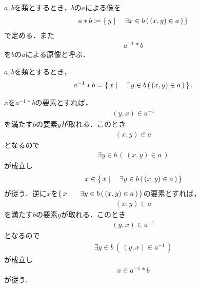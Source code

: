 	\begin{screen}
		\begin{dfn}[像・原像]
			$a,b$を類とするとき，$b$の$a$による像を
			\begin{align}
				a \ast b \coloneqq \left\{\, y \mid \quad \exists x \in b\, (\, (x,y) \in a\, )\, \right\} 
			\end{align}
			で定める．また
			\begin{align}
				a^{-1} \ast b
			\end{align}
			を$b$の$a$による原像と呼ぶ．
		\end{dfn}
	\end{screen}
	
	\begin{screen}
		\begin{thm}[原像はそこに写される定義域の要素の全体]
			$a,b$を類とするとき，
			\begin{align}
				a^{-1} \ast b = \left\{\, x \mid \quad \exists y \in b\, (\, (x,y) \in a\, )\, \right\}.
			\end{align}
		\end{thm}
	\end{screen}
	
	\begin{sketch}
		$x$を$a^{-1} \ast b$の要素とすれば，
		\begin{align}
			(y,x) \in a^{-1}
		\end{align}
		を満たす$b$の要素$y$が取れる．このとき
		\begin{align}
			(x,y) \in a
		\end{align}
		となるので
		\begin{align}
			\exists y \in b\, (\, (x,y) \in a\, )
		\end{align}
		が成立し
		\begin{align}
			x \in \left\{\, x \mid \quad \exists y \in b\, (\, (x,y) \in a\, )\, \right\}
		\end{align}
		が従う．逆に$x$を$\left\{\, x \mid \quad \exists y \in b\, (\, (x,y) \in a\, )\, \right\}$の要素とすれば，
		\begin{align}
			(x,y) \in a
		\end{align}
		を満たす$b$の要素$y$が取れる．このとき
		\begin{align}
			(y,x) \in a^{-1}
		\end{align}
		となるので
		\begin{align}
			\exists y \in b\, (\, (y,x) \in a^{-1}\, )
		\end{align}
		が成立し
		\begin{align}
			x \in a^{-1} \ast b
		\end{align}
		が従う．
		\QED
	\end{sketch}
	
